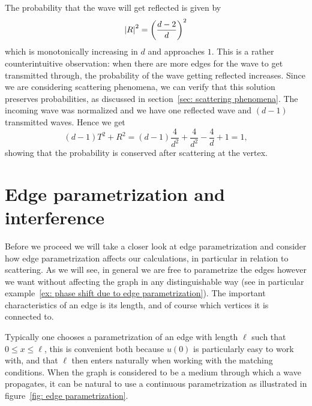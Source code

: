 The probability that the wave will get reflected is given by
\[
  \left\lvert R\right\rvert^2 = \left(\frac{d-2}{d}\right)^2
\]
which is monotonically increasing in $d$ and approaches $1$. This is a rather counterintuitive observation: when there are more edges for the wave to get transmitted through, the probability of the wave getting reflected increases. Since we are considering scattering phenomena, we can verify that this solution preserves probabilities, as discussed in section~\ref{sec: scattering phenomena}. The incoming wave was normalized and we have one reflected wave and $(d-1)$ transmitted waves. Hence we get
\[
  (d-1)T^2 + R^2 = (d-1)\frac{4}{d^2} + \frac{4}{d^2} - \frac{4}{d} + 1 = 1,
\]
showing that the probability is conserved after scattering at the vertex.



\section{Edge parametrization and interference}\label{sec: edge parametrization}

Before we proceed we will take a closer look at edge parametrization and consider how edge parametrization affects our calculations, in particular in relation to scattering. As we will see, in general we are free to parametrize the edges however we want without affecting the graph in any distinguishable way (see in particular example~\ref{ex: phase shift due to edge parametrization}). The important characteristics of an edge is its length, and of course which vertices it is connected to.

Typically one chooses a parametrization of an edge with length $\ell$ such that $0 \le x \le \ell$, this is convenient both because $u(0)$ is particularly easy to work with, and that $\ell$ then enters naturally when working with the matching conditions. When the graph is considered to be a medium through which a wave propagates, it can be
natural to use a continuous parametrization as illustrated in figure~\ref{fig: edge parametrization}.


